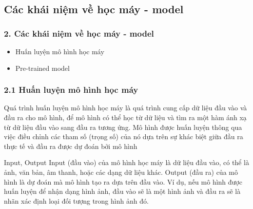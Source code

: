 \documentclass{beamer}
\begin{document}
\begin{frame}

\section{Các khái niệm về học máy - model} 
\frametitle{2. Các khái niệm về học máy - model}

\begin{itemize}
\item Huấn luyện mô hình học máy
\item Pre-trained model

\end{itemize}

\end{frame}


\begin{frame}
\frametitle{2.1 Huấn luyện mô hình học máy}

\begin{block}{Quá trình huấn luyện mô hình học máy}
là quá trình cung cấp dữ liệu đầu vào và đầu ra cho
mô hình, để mô hình có thể học từ dữ liệu và tìm ra một hàm ánh xạ từ dữ liệu đầu vào sang đầu
ra tương ứng. Mô hình được huấn luyện thông qua việc điều chỉnh các tham số (trọng số) của nó
dựa trên sự khác biệt giữa đầu ra thực tế và đầu ra được dự đoán bởi mô hình

\end{block}

\begin{block}{Input, Output}
Input (đầu vào) của mô hình học máy là dữ liệu đầu vào, có thể là ảnh, văn bản, âm thanh, hoặc các dạng dữ liệu khác. Output (đầu ra) của mô hình là dự đoán mà mô hình
tạo ra dựa trên đầu vào. Ví dụ, nếu mô hình được huấn luyện để nhận dạng hình ảnh, đầu vào sẽ là một hình ảnh và đầu ra sẽ là nhãn xác định loại đối tượng trong hình ảnh đó.

\end{block}

\end{frame}
\end{document}
